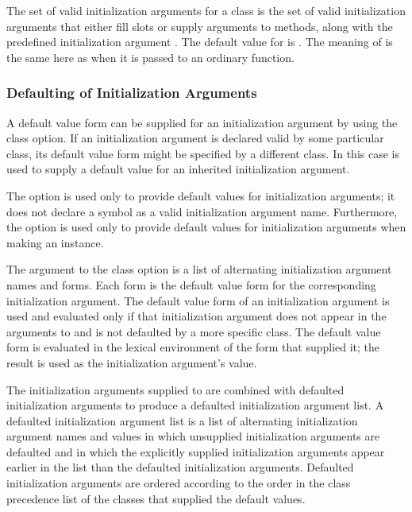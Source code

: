 The set of valid initialization arguments for a class is the set of
valid initialization arguments that either fill slots or supply
arguments to methods, along with the predefined initialization
argument .  The default value for 
 is .  The meaning of 
 is the same here as when it is passed to an ordinary
function.


\subsubsection{Defaulting of Initialization Arguments}

A {\bit default value form\/} can be supplied for an initialization
argument by using the  class option.  If an
initialization argument is declared valid by some particular class,
its default  value form might be specified by a different class. 
In this case  is used to supply a default value
for an inherited initialization argument.

The  option is used only to provide default
values for initialization arguments; it does not declare a symbol as a
valid initialization argument name.  Furthermore, the 
 option is used only to provide default values for
initialization arguments when making an instance.

The argument to the  class option is a list of
alternating initialization argument names and forms.  Each form is the
default  value form for the corresponding initialization
argument.  The default  value form of an initialization
argument is used and evaluated only if that initialization argument
does not appear in the arguments to  and is not
defaulted by a more specific class.  The default  value form is
evaluated in the lexical environment of the  form that
supplied it; the result is used as the initialization
argument's value.

The initialization arguments supplied to  are combined
with defaulted initialization arguments to produce a {\bit
defaulted initialization argument list}. A defaulted initialization
argument list is a list of alternating initialization argument names and
values in which unsupplied initialization arguments are defaulted and in
which the explicitly supplied initialization arguments appear earlier in
the list than the defaulted initialization arguments.  Defaulted
initialization arguments are ordered according to the order in the class
precedence list of the classes that supplied the default values.

